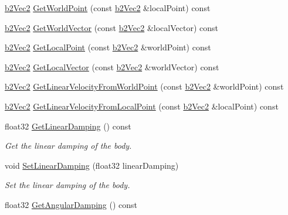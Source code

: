 \begin{DoxyCompactItemize}
\item 
\hyperlink{structb2_vec2}{b2\-Vec2} \hyperlink{classb2_body_a8055b90bccb51383caa8c42fbc96c9c3}{Get\-World\-Point} (const \hyperlink{structb2_vec2}{b2\-Vec2} \&local\-Point) const 
\item 
\hyperlink{structb2_vec2}{b2\-Vec2} \hyperlink{classb2_body_afd44622669b5e45202c23e4a212895fc}{Get\-World\-Vector} (const \hyperlink{structb2_vec2}{b2\-Vec2} \&local\-Vector) const 
\item 
\hyperlink{structb2_vec2}{b2\-Vec2} \hyperlink{classb2_body_a8f9ef0226b7eb989e700fa8898d29fc0}{Get\-Local\-Point} (const \hyperlink{structb2_vec2}{b2\-Vec2} \&world\-Point) const 
\item 
\hyperlink{structb2_vec2}{b2\-Vec2} \hyperlink{classb2_body_a93de09565c0c1a9da2601c1847aa22df}{Get\-Local\-Vector} (const \hyperlink{structb2_vec2}{b2\-Vec2} \&world\-Vector) const 
\item 
\hyperlink{structb2_vec2}{b2\-Vec2} \hyperlink{classb2_body_a4238ae43f5afeb2126b8e8bf765334b5}{Get\-Linear\-Velocity\-From\-World\-Point} (const \hyperlink{structb2_vec2}{b2\-Vec2} \&world\-Point) const 
\item 
\hyperlink{structb2_vec2}{b2\-Vec2} \hyperlink{classb2_body_a4429e3f380e882def11c52ac893b8e2e}{Get\-Linear\-Velocity\-From\-Local\-Point} (const \hyperlink{structb2_vec2}{b2\-Vec2} \&local\-Point) const 
\item 
\hypertarget{classb2_body_a7283e4821d24aed0fa5b0f7891175183}{float32 \hyperlink{classb2_body_a7283e4821d24aed0fa5b0f7891175183}{Get\-Linear\-Damping} () const }\label{classb2_body_a7283e4821d24aed0fa5b0f7891175183}

\begin{DoxyCompactList}\small\item\em Get the linear damping of the body. \end{DoxyCompactList}\item 
\hypertarget{classb2_body_a909f9753ad700f70282a56e00bc182a5}{void \hyperlink{classb2_body_a909f9753ad700f70282a56e00bc182a5}{Set\-Linear\-Damping} (float32 linear\-Damping)}\label{classb2_body_a909f9753ad700f70282a56e00bc182a5}

\begin{DoxyCompactList}\small\item\em Set the linear damping of the body. \end{DoxyCompactList}\item 
\hypertarget{classb2_body_a5153143f2593802c85e54a21de5464ce}{float32 \hyperlink{classb2_body_a5153143f2593802c85e54a21de5464ce}{Get\-Angular\-Damping} () const }\label{classb2_body_a5153143f2593802c85e54a21de5464ce}


\end{DoxyCompactItemize}
